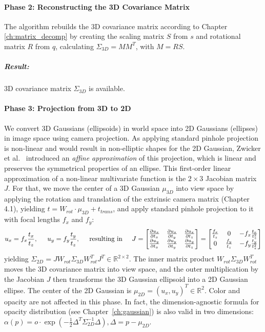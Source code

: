 \vspace{-5pt}
\paragraph{Phase 2: Reconstructing the 3D Covariance Matrix} The algorithm rebuilds the 3D covariance matrix according to Chapter \ref{ch:matrix_decomp} by creating the scaling matrix $S$ from $s$ and rotational matrix $R$ from $q$, calculating $\Sigma_{3D} = M M^T$, with $M = RS$.
\subparagraph{Result:} 3D covariance matrix $\Sigma_{3D}$ is available.

\vspace{-5pt} 
\paragraph{Phase 3: Projection from 3D to 2D} We convert 3D Gaussians (ellipsoids) in world space into 2D Gaussians (ellipses) in image space using camera projection. 
As applying standard pinhole projection~\cite{marschnerFundamentalsComputerGraphics2021} is non-linear and would result in non-elliptic shapes for the 2D Gaussian, Zwicker et al.~\cite{zwickerEWAVolumeSplatting2001} introduced an \textit{affine approximation} of this projection, which is linear and preserves the symmetrical properties of an ellipse.
This first-order linear approximation of a non-linear multivariate function is the $2\times 3$ Jacobian matrix~$J$.\linebreak
For that, we move the center of a 3D Gaussian $\mu_{3D}$ into view space by applying the rotation and translation of the extrinsic camera matrix (Chapter 4.1), yielding $t = W_{rot} \cdot \mu_{3D} + t_{trans}$, and apply standard pinhole projection to it with focal lengths $f_x$ and $f_y$:
$$
u_x = f_x \frac{t_x}{t_z}, \hspace{0.5cm}
u_y = f_y \frac{t_y}{t_z}, \hspace{0.5cm}
\text{resulting in} \hspace{0.5cm} 
J = \begin{bmatrix} 
    \frac{\partial u_x}{\partial t_x} & \frac{\partial u_x}{\partial t_y} & \frac{\partial u_x}{\partial t_z} \\
    \frac{\partial u_y}{\partial t_x} & \frac{\partial u_y}{\partial t_y} & \frac{\partial u_y}{\partial t_z}
\end{bmatrix} = 
\begin{bmatrix} 
    \frac{f_x}{t_z} & 0 & -f_x \frac{t_x}{t_z^2} \\
    0 & \frac{f_y}{t_z} & -f_y \frac{t_y}{t_z^2}
\end{bmatrix}
$$
yielding $\Sigma_{2D} = J W_{rot} \Sigma_{3D} W_{rot}^T J^T \in \mathbb{R}^{2\times 2}$. The inner matrix product $W_{rot} \Sigma_{3D} W_{rot}^T$ moves the 3D covariance matrix into view space, and the outer multiplication by the Jacobian $J$ then transforms the 3D Gaussian ellipsoid into a 2D Gaussian ellipse.
The center of the 2D Gaussian is $\mu_{2D}=(u_x, u_y)^T \in \mathbb{R}^2$. Color and opacity are not affected in this phase. In fact, the dimension-agnostic formula for opacity distribution (see Chapter~\ref{ch:gaussian}) is also valid in two dimensions: $\alpha(p) = o \cdot \exp\left(-\frac{1}{2}\Delta^T \Sigma^{-1}_{2D}\Delta\right), \Delta = p - \mu_{2D}$.

